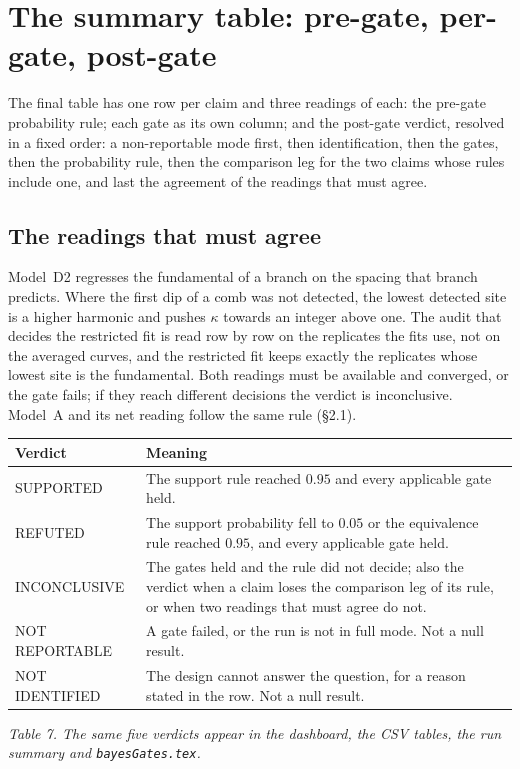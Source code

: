 \documentclass[10pt,a4paper]{article}
\newcommand{\code}[1]{\texttt{\UseBreakableUnderscores #1}}
\newcommand{\UseBreakableUnderscores}{\def\_{\textunderscore\allowbreak}}
\begin{document}
\section{The summary table: pre-gate, per-gate, post-gate}
The final table has one row per claim and three readings of each: the pre-gate probability rule; each gate as its own column; and the post-gate verdict, resolved in a fixed order: a non-reportable mode first, then identification, then the gates, then the probability rule, then the comparison leg for the two claims whose rules include one, and last the agreement of the readings that must agree.

\subsection{The readings that must agree}
Model~D2 regresses the fundamental of a branch on the spacing that branch predicts. Where the first dip of a comb was not detected, the lowest detected site is a higher harmonic and pushes $\kappa$ towards an integer above one. The audit that decides the restricted fit is read row by row on the replicates the fits use, not on the averaged curves, and the restricted fit keeps exactly the replicates whose lowest site is the fundamental. Both readings must be available and converged, or the gate fails; if they reach different decisions the verdict is inconclusive. Model~A and its net reading follow the same rule (§2.1).

\begin{center}\small
\begin{tabularx}{\textwidth}{@{}L{3.2cm}Y@{}}
\toprule
\textbf{Verdict} & \textbf{Meaning}\\
\midrule
SUPPORTED & The support rule reached $0.95$ and every applicable gate held.\\
REFUTED & The support probability fell to $0.05$ or the equivalence rule reached $0.95$, and every applicable gate held.\\
INCONCLUSIVE & The gates held and the rule did not decide; also the verdict when a claim loses the comparison leg of its rule, or when two readings that must agree do not.\\
NOT REPORTABLE & A gate failed, or the run is not in full mode. Not a null result.\\
NOT IDENTIFIED & The design cannot answer the question, for a reason stated in the row. Not a null result.\\
\bottomrule
\end{tabularx}
\end{center}
{\small\itshape Table 7. The same five verdicts appear in the dashboard, the CSV tables, the run summary and \code{bayesGates.tex}.}
\end{document}
